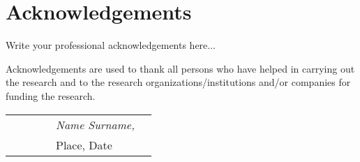 \section*{Acknowledgements}

Write your professional acknowledgements here... 

Acknowledgements are used to thank all persons who have helped in carrying out the research and to the research organizations/institutions and/or companies for funding the research. 

\begin{table}[hb]
\begin{tabular}{lp{6.67cm}llll}
& & & & \textit{Name Surname,} \\
& & & & Place, Date
\end{tabular}
\end{table}



